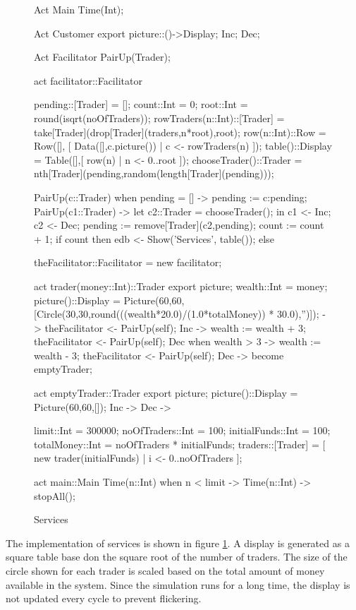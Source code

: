 \documentclass[5p,times]{elsarticle}
\begin{document}
\begin{figure}
\begin{ESL}
Act Main { Time(Int); }

Act Customer  { 
  export picture::()->Display; 
  Inc; Dec;
}

Act Facilitator {  PairUp(Trader); }

act facilitator::Facilitator {
  
  pending::[Trader]                = [];
  count::Int                       = 0;
  root::Int                        = round(isqrt(noOfTraders));
  rowTraders(n::Int)::[Trader]      = take[Trader](drop[Trader](traders,n*root),root);
  row(n::Int)::Row                  = Row([], [ Data([],c.picture()) | c <- rowTraders(n) ]);
  table()::Display                 = Table([],[ row(n) | n <- 0..root ]);
  chooseTrader()::Trader           = nth[Trader](pending,random(length[Trader](pending)));
  
  PairUp(c::Trader) when pending = [] -> pending := c:pending;
  PairUp(c1::Trader) -> {
    let c2::Trader = chooseTrader();
    in {
      c1 <- Inc;
      c2 <- Dec;
      pending := remove[Trader](c2,pending);
      count := count + 1;
      if count %
      then edb <- Show('Services', table());
      else {}
    }
  }
}

theFacilitator::Facilitator = new facilitator;

act trader(money::Int)::Trader {
  export picture;
  wealth::Int = money;
  picture()::Display = Picture(60,60,[Circle(30,30,round(((wealth*20.0)/(1.0*totalMoney)) * 30.0),'')]);
  -> theFacilitator <- PairUp(self);
  Inc -> {
    wealth := wealth + 3;
    theFacilitator <- PairUp(self);
  }
  Dec when wealth > 3 -> {
    wealth := wealth - 3;
    theFacilitator <- PairUp(self);
  }
  Dec -> become emptyTrader;
}

act emptyTrader::Trader {
  export picture;
  picture()::Display = Picture(60,60,[]);
  Inc -> {}
  Dec -> {}
}

limit::Int            = 300000;
noOfTraders::Int      = 100;
initialFunds::Int     = 100;
totalMoney::Int       = noOfTraders * initialFunds;
traders::[Trader]     = [ new trader(initialFunds) | i <- 0..noOfTraders ];

act main::Main {
  Time(n::Int) when n < limit -> {}
  Time(n::Int) -> stopAll();
}
\end{ESL}
\caption{Services}
\label{fig:services}
\end{figure}
The implementation of services is shown in figure \ref{fig:services}. A display is generated as a square table  base don the square root of the number of traders. The size of the circle shown for each trader is scaled based on the total amount of money available in the system. Since the simulation runs for a long time, the display is not updated every cycle to prevent flickering.
\end{document}
